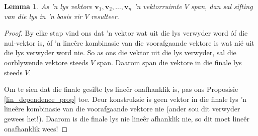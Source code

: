 \documentclass[a4paper,11pt]{book}
\newtheorem{lemma}[theorem]{Lemma}
\theoremstyle{definition}
\newcommand{\ve}[1]{\mathbf{#1}}
\begin{document}
\begin{lemma} 
	\label{sift_lemma_basis} As 'n lys vektore $\ve{v}_1, \ve{v}_2, \ldots,
	\ve{v}_n$ 'n vektorruimte $V$ span, dan sal sifting van die lys in 'n
	basis vir $V$ resulteer.
\end{lemma}
\begin{proof} 
	By elke stap vind ons dat 'n vektor wat uit die lys verwyder word
	{\'o}f die nul-vektor is, {\'o}f 'n line{\^e}re kombinasie van die
	voorafgaande vektore is wat ni{\'e} uit die lys verwyder word nie. So
	as ons die vektor uit die lys verwyder, sal die oorblywende vektore
	steeds $V$ span. Daarom span die vektore in die finale lys steeds $V$.

	Om te sien dat die finale gesifte lys line{\^e}r onafhanklik is, pas
	ons Proposisie \ref{lin_dependence_prop} toe. Deur konstruksie is geen
	vektor in die finale lys 'n line{\^e}re kombinasie van die voorafgaande
	vektore nie (ander sou dit verwyder gewees het!). Daarom is die finale
	lys nie line{\^e}r afhanklik nie, so dit moet line{\^e}r onafhanklik
	wees!
\end{proof}
\end{document}
